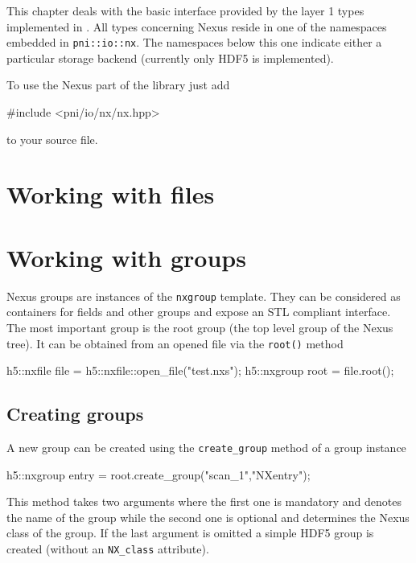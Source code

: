 
This chapter deals with the basic interface provided by the layer 1 types
implemented in \libpniio. All types concerning Nexus reside in one of the
namespaces embedded in {\tt pni::io::nx}. The namespaces below this one 
indicate either a particular storage backend (currently only HDF5 is
implemented).

To use the Nexus part of the library just add 
\begin{cppcode}
#include <pni/io/nx/nx.hpp>
\end{cppcode}
to your source file. 

\section{Working with files}



\section{Working with groups}

Nexus groups are instances of the {\tt nxgroup} template. They can be considered
as containers for fields and other groups and expose an STL compliant interface. 
The most important group is the root group (the top level group of the Nexus
tree). It can be obtained from an opened file via the {\tt root()} method
\begin{cppcode}
h5::nxfile file = h5::nxfile::open_file("test.nxs");
h5::nxgroup root = file.root();
\end{cppcode}

\subsection{Creating groups}

A new group can be created using the {\tt create\_group} method of a group
instance
\begin{cppcode}
h5::nxgroup entry = root.create_group("scan_1","NXentry");
\end{cppcode}
This method takes two arguments where the first one is mandatory and denotes the
name of the group while the second one is optional and determines the Nexus
class of the group. If the last argument is omitted a simple HDF5 group is
created (without an {\tt NX\_class}  attribute).

